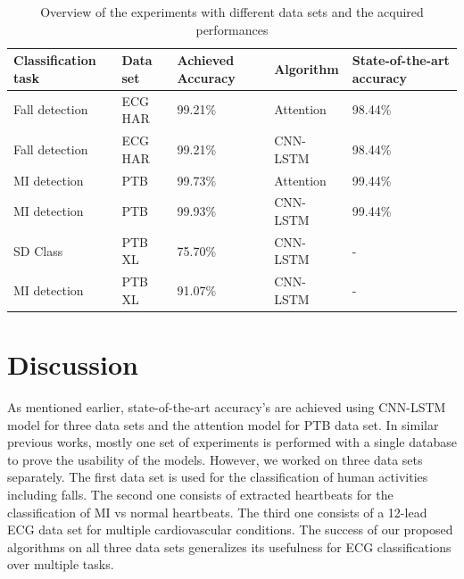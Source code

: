 \documentclass{ieeeaccess}
\newcommand{\todo}[1]{\textbf{\ \textcolor{red}{#1}}}
\begin{document}
\begin{table}[!ht]
    \centering%
    \caption{Overview of the experiments with different data sets and the
acquired performances}
    \label{tbl:overview}
    \small
    \begin{tabular}{*{5}{p{}}}
          \toprule
    \textbf{Classification task} &\textbf{Data set} &  \textbf{Achieved Accuracy} &\textbf{Algorithm} &\textbf{State-of-the-art accuracy}
      \\\midrule
     Fall detection & ECG HAR  & 99.21\% & Attention & 98.44\% \cite{2021}\\
     Fall detection & ECG HAR  & 99.21\% & CNN-LSTM & 98.44\%\cite{2021}\\
     MI detection & PTB  & 99.73\% & Attention & 99.44\%\cite{10.1007/978-3-030-64610-3_40}  \\
     MI detection & PTB  & 99.93\% & CNN-LSTM & 99.44\%\cite{10.1007/978-3-030-64610-3_40} \\
    SD Class & PTB XL & 75.70\% & CNN-LSTM & - \\
     MI detection & PTB XL & 91.07\% & CNN-LSTM & -\\
      
      
     \bottomrule
    \end{tabular}
\end{table}
\section{Discussion}
As mentioned earlier, state-of-the-art accuracy's are achieved using CNN-LSTM model for three data sets and the attention model for PTB data set. In similar previous works, mostly one set of experiments is performed with a single database to prove the usability of the models. However, we worked on three data sets separately. The first data set is used for the classification of human activities including falls. The second one consists of extracted heartbeats for the classification of MI vs normal heartbeats. The third one consists of a 12-lead ECG data set for multiple cardiovascular conditions. The success of our proposed algorithms on all three data sets generalizes its usefulness for ECG classifications over multiple tasks.
\end{document}
